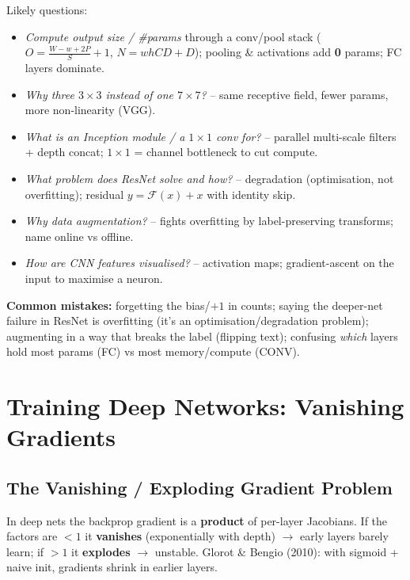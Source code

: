 \documentclass[10pt,a4paper]{article}
\begin{document}
	\begin{examtipbox}
		Likely questions:
		\begin{itemize}[leftmargin=*]
			\item \emph{Compute output size / \#params} through a conv/pool stack ($O=\frac{W-w+2P}{S}+1$, $N=whCD+D$); pooling \& activations add \textbf{0} params; FC layers dominate.
			\item \emph{Why three $3{\times}3$ instead of one $7{\times}7$?} -- same receptive field, fewer params, more non-linearity (VGG).
			\item \emph{What is an Inception module / a $1{\times}1$ conv for?} -- parallel multi-scale filters + depth concat; $1{\times}1$ = channel bottleneck to cut compute.
			\item \emph{What problem does ResNet solve and how?} -- degradation (optimisation, not overfitting); residual $y=\mathcal{F}(x)+x$ with identity skip.
			\item \emph{Why data augmentation?} -- fights overfitting by label-preserving transforms; name online vs offline.
			\item \emph{How are CNN features visualised?} -- activation maps; gradient-ascent on the input to maximise a neuron.
		\end{itemize}
		\textbf{Common mistakes:} forgetting the bias/$+1$ in counts; saying the deeper-net failure in ResNet is overfitting (it's an optimisation/degradation problem); augmenting in a way that breaks the label (flipping text); confusing \emph{which} layers hold most params (FC) vs most memory/compute (CONV).
	\end{examtipbox}
	\section{Training Deep Networks: Vanishing Gradients}

	\subsection{The Vanishing / Exploding Gradient Problem}

	\begin{definitionbox}
		In deep nets the backprop gradient is a \textbf{product} of per-layer Jacobians. If the factors are $<1$ it \textbf{vanishes} (exponentially with depth) $\rightarrow$ early layers barely learn; if $>1$ it \textbf{explodes} $\rightarrow$ unstable. Glorot \& Bengio (2010): with sigmoid + naive init, gradients shrink in earlier layers.
	\end{definitionbox}
\end{document}
